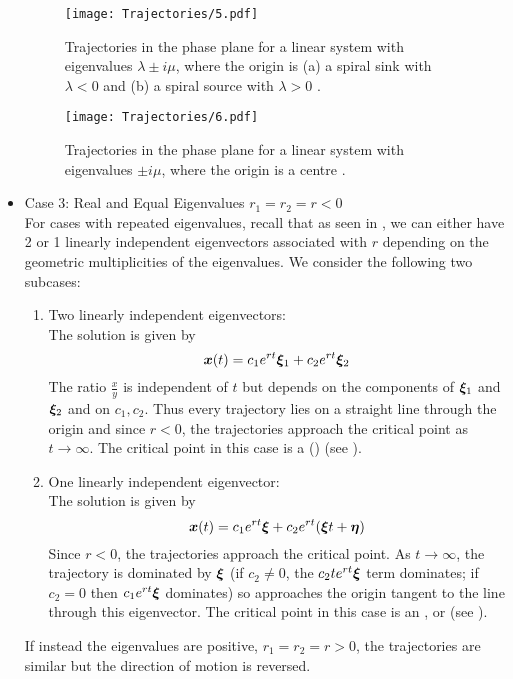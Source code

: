 \begin{itemize}
	\begin{figure}[H]
		\centering
		\texttt{[image: Trajectories/5.pdf]}
		\caption{Trajectories in the phase plane for a linear system with eigenvalues $\lambda \pm i\mu$, where the origin is (a) a spiral sink with $\lambda <0$ and (b) a spiral source with $\lambda >0$ \cite[Figure 9.1.5]{boyce}.}
		\label{fig:trajectory5}
	\end{figure}
	
	\begin{figure}[H]
		\centering
		\texttt{[image: Trajectories/6.pdf]}
		\caption{Trajectories in the phase plane for a linear system with eigenvalues $\pm i\mu$, where the origin is a centre \cite[Figure 9.1.6(a)]{boyce}.}
		\label{fig:trajectory6}
	\end{figure}
	
	\item Case 3: Real and Equal Eigenvalues $r_1 = r_2 = r < 0$\\
	For cases with repeated eigenvalues, recall that as seen in , we can either have 2 or 1 linearly independent eigenvectors associated with $r$ depending on the geometric multiplicities of the eigenvalues. We consider the following two subcases:
	\begin{enumerate}[label=(\roman*)]
		\item Two linearly independent eigenvectors: \\ 
		The solution is given by 
		\[
		\bm{x}(t) = c_1 e^{rt} \bm{\xi}_1 + c_2 e^{rt} \bm{\xi}_2
		\]
		The ratio $\frac{x}{y}$ is independent of $t$ but depends on the components of $\bm{\xi}_1$ and $\bm{\xi}_2$ and on $c_1, c_2$. Thus every trajectory lies on a straight line through the origin and since $r<0$, the trajectories approach the critical point as $t \to \infty$. The critical point in this case is a  () (see ).
		
		\item One linearly independent eigenvector: \\
		The solution is given by 
		\[
		\bm{x}(t) = c_1 e^{rt} \bm{\xi} + c_2 e^{rt} (\bm{\xi} t + \bm{\eta})
		\]
		Since $r<0$, the trajectories approach the critical point. As $t \to \infty$, the trajectory is dominated by $\bm{\xi}$ (if $c_2 \neq 0$, the $c_2 te^{rt} \bm{\xi}$ term dominates; if $c_2 = 0$ then $c_1 e^{rt} \bm{\xi}$ dominates) so approaches the origin tangent to the line through this eigenvector. The critical point in this case is an , or  (see ).
	\end{enumerate}
	If instead the eigenvalues are positive, $r_1 = r_2 = r > 0$, the trajectories are similar but the direction of motion is reversed.
\end{itemize}

